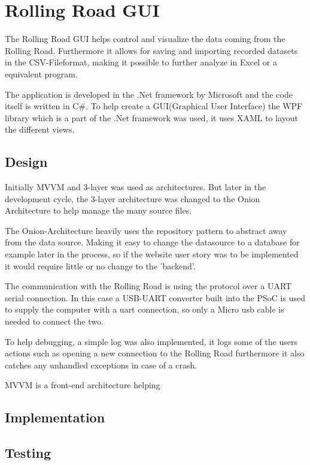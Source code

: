 \section{Rolling Road GUI}

The Rolling Road GUI helps control and visualize the data coming from the Rolling Road. Furthermore it allows for saving and importing recorded datasets in the CSV-Fileformat, making it possible to further analyze in Excel or a equivalent program.

The application is developed in the .Net framework by Microsoft and the code itself is written in C\#.
To help create a GUI(Graphical User Interface) the WPF library which is a part of the .Net framework was used, it uses XAML to layout the different views.

\subsection{Design}

Initially MVVM and 3-layer was used as architectures. But later in the development cycle, the 3-layer architecture was changed to the Onion Architecture to help manage the many source files.

The Onion-Architecture heavily uses the repository pattern to abstract away from the data source. Making it easy to change the datasource to a database for example later in the process, so if the website user story was to be implemented it would require little or no change to the 'backend'.

The communication with the Rolling Road is using the  protocol over a UART serial connection. In this case a USB-UART converter built into the PSoC is used to supply the computer with a uart connection, so only a Micro usb cable is needed to connect the two.

To help debugging, a simple log was also implemented, it logs some of the users actions such as opening a new connection to the Rolling Road furthermore it also catches any unhandled exceptions in case of a crash.

MVVM is a front-end architecture helping 

\subsection{Implementation}

\subsection{Testing}